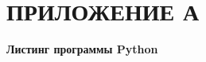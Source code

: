 \chapter*{\hfill ПРИЛОЖЕНИЕ А}

\begin{center}
	\textbf{Листинг программы Python}
\end{center}

\begin{lstlisting}[language=Python]

\end{lstlisting}